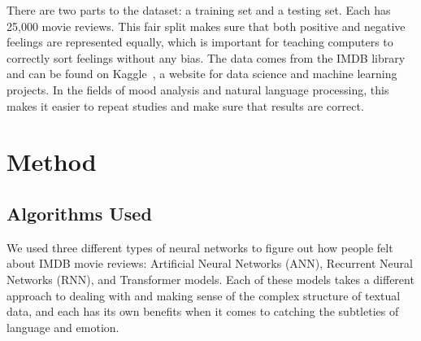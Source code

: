 \documentclass[11pt,a4paper]{article}
\begin{document}
There are two parts to the dataset: a training set and a testing set. Each has 25,000 movie reviews. This fair split makes sure that both positive and negative feelings are represented equally, which is important for teaching computers to correctly sort feelings without any bias. The data comes from the IMDB library and can be found on Kaggle~\citep{maas2011learning}, a website for data science and machine learning projects. In the fields of mood analysis and natural language processing, this makes it easier to repeat studies and make sure that results are correct.





\section{Method}

\subsection{Algorithms Used}

We used three different types of neural networks to figure out how people felt about IMDB movie reviews: Artificial Neural Networks (ANN), Recurrent Neural Networks (RNN), and Transformer models. Each of these models takes a different approach to dealing with and making sense of the complex structure of textual data, and each has its own benefits when it comes to catching the subtleties of language and emotion.

\end{document}
